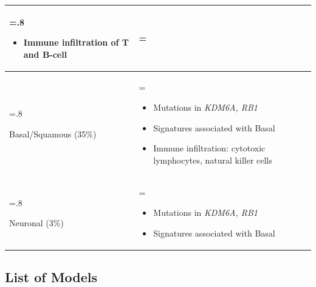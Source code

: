 \begin{table}[!htb]
\begin{tabularx}{\textwidth}{>{\hsize=.8\hsize\raggedright\arraybackslash}X >{\hsize=\hsize\arraybackslash}X}
\begin{itemize}[leftmargin=*, nosep, after=\vspace{-\baselineskip}]
        \item Immune infiltration of T and B-cell
    \end{itemize} \\
    \midrule
    Basal/Squamous (35\%) & 
    \begin{itemize}[leftmargin=*, nosep, after=\vspace{-\baselineskip}]
        \item Mutations in \textit{KDM6A, RB1}
        \item Signatures associated with Basal
        \item Immune infiltration: cytotoxic lymphocytes, natural killer cells
    \end{itemize} \\
    \midrule
    Neuronal (3\%) & 
    \begin{itemize}[leftmargin=*, nosep, after=\vspace{-\baselineskip}]
        \item Mutations in \textit{KDM6A, RB1}
        \item Signatures associated with Basal
    \end{itemize} \\
    \bottomrule
    \end{tabularx}
    \label{tab:lit:consensus_genes}
\end{table}

\newpage



\subsection{List of Models} \label{ap:tables_models}

\newpage

